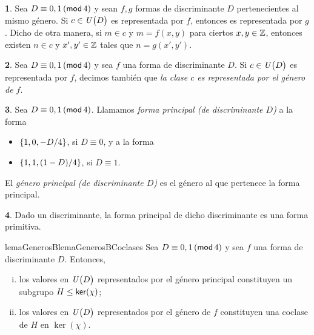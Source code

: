 \theoremstyle{plain}
\newtheorem{teoGenerosB}{\teoname}[section]
\newtheorem{lemaGenerosB}[teoGenerosB]{\lemaname}
\newtheorem{coroGenerosB}[teoGenerosB]{\coroname}

\theoremstyle{definition}
\newtheorem{obsGenerosB}[teoGenerosB]{\obsname}
\newtheorem{defGenerosB}[teoGenerosB]{}


\begin{obsGenerosB}\label{obs:generos:representacion}
	Sea $D\equiv 0,1\tmodulo[4]$ y sean $f,g$ formas
	de discriminante $D$ pertenecientes al mismo g\'enero.
	Si $c\in\Unidadesmod[D]$ es representada por $f$, entonces
	es representada por $g$. Dicho de otra manera, si
	$m\in c$ y $m=f(x,y)$ para ciertos $x,y\in\Enteros$, entonces
	existen $n\in c$ y $x',y'\in\Enteros$ tales que
	$n=g(x',y')$.
\end{obsGenerosB}

\begin{defGenerosB}\label{def:generos:representacion}
	Sea $D\equiv 0,1\tmodulo[4]$ y sea $f$ una forma
	de discriminante $D$. Si $c\in\Unidadesmod[D]$ es
	representada por $f$, decimos tambi\'en que
	\emph{la clase $c$ es representada por el g\'enero de $f$}.
\end{defGenerosB}

\begin{defGenerosB}\label{def:generos:principal}
	Sea $D\equiv 0,1\tmodulo[4]$. Llamamos
	\emph{forma principal (de discriminante $D$)} a la forma
	\begin{itemize}
		\item $\binaria{1,0,-D/4}$, si $D\equiv 0$, y a la forma
		\item $\binaria{1,1,(1-D)/4}$, si $D\equiv 1$.
	\end{itemize}
	El \emph{g\'enero principal (de discriminante $D$)} es el
	g\'enero al que pertenece la forma principal.
\end{defGenerosB}

\begin{obsGenerosB}\label{obs:generos:principal}
	Dado un discriminante, la forma principal de dicho discriminante
	es una forma primitiva.
\end{obsGenerosB}

\begin{restatable}{lemaGenerosB}{lemaGenerosBCoclases}
	\label{lema:generos}
	Sea $D\equiv 0,1\tmodulo[4]$ y sea $f$ una forma
	de discriminante $D$. Entonces,
	\begin{enumerate}[(i)]
		\item\label{item:lema:generos:principal}
			los valores en $\Unidadesmod[D]$ representados por
			el g\'enero principal constituyen un subgrupo
			$H\subgrpeq\ker(\chi)$;
		\item\label{item:lema:generos:coclases}
			los valores en $\Unidadesmod[D]$ representados por
			el g\'enero de $f$ constituyen una coclase de $H$
			en $\ker(\chi)$.
	\end{enumerate}
\end{restatable}

